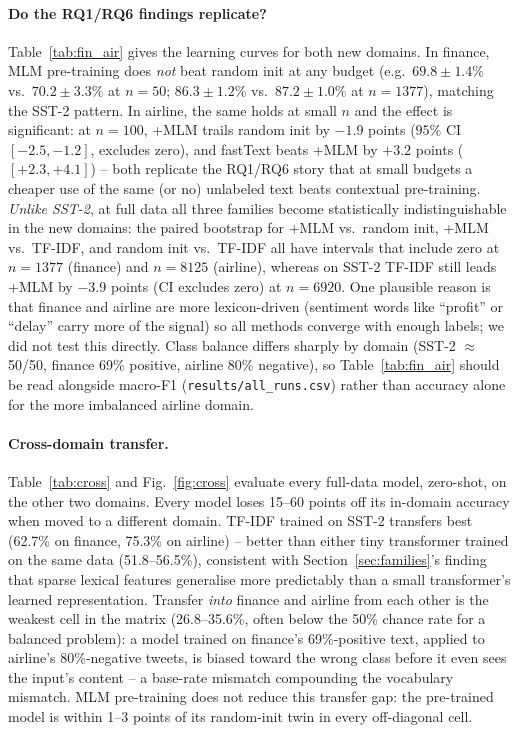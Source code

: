 \documentclass[11pt,a4paper]{article}
\begin{document}
\paragraph{Do the RQ1/RQ6 findings replicate?} Table~\ref{tab:fin_air} gives the learning curves for both new domains. In finance, MLM pre-training does \emph{not} beat random init at any budget (e.g.\ $69.8\pm1.4\%$ vs.\ $70.2\pm3.3\%$ at $n{=}50$; $86.3\pm1.2\%$ vs.\ $87.2\pm1.0\%$ at $n{=}1377$), matching the SST-2 pattern. In airline, the same holds at small $n$ and the effect is significant: at $n{=}100$, +MLM trails random init by $-1.9$ points ($95\%$ CI $[-2.5,-1.2]$, excludes zero), and fastText beats +MLM by $+3.2$ points ($[+2.3,+4.1]$) -- both replicate the RQ1/RQ6 story that at small budgets a cheaper use of the same (or no) unlabeled text beats contextual pre-training.
\emph{Unlike SST-2}, at full data all three families become statistically indistinguishable in the new domains: the paired bootstrap for +MLM vs.\ random init, +MLM vs.\ TF-IDF, and random init vs.\ TF-IDF all have intervals that include zero at $n{=}1377$ (finance) and $n{=}8125$ (airline), whereas on SST-2 TF-IDF still leads +MLM by $-3.9$ points (CI excludes zero) at $n{=}6920$. One plausible reason is that finance and airline are more lexicon-driven (sentiment words like ``profit'' or ``delay'' carry more of the signal) so all methods converge with enough labels; we did not test this directly.
Class balance differs sharply by domain (SST-2 $\approx$50/50, finance 69\% positive, airline 80\% negative), so Table~\ref{tab:fin_air} should be read alongside macro-F1 (\texttt{results/all\_runs.csv}) rather than accuracy alone for the more imbalanced airline domain.





\paragraph{Cross-domain transfer.} Table~\ref{tab:cross} and Fig.~\ref{fig:cross} evaluate every full-data model, zero-shot, on the other two domains. Every model loses 15--60 points off its in-domain accuracy when moved to a different domain. TF-IDF trained on SST-2 transfers best (62.7\% on finance, 75.3\% on airline) -- better than either tiny transformer trained on the same data (51.8--56.5\%), consistent with Section~\ref{sec:families}'s finding that sparse lexical features generalise more predictably than a small transformer's learned representation.
Transfer \emph{into} finance and airline from each other is the weakest cell in the matrix (26.8--35.6\%, often below the 50\% chance rate for a balanced problem): a model trained on finance's 69\%-positive text, applied to airline's 80\%-negative tweets, is biased toward the wrong class before it even sees the input's content -- a base-rate mismatch compounding the vocabulary mismatch. MLM pre-training does not reduce this transfer gap: the pre-trained model is within 1--3 points of its random-init twin in every off-diagonal cell.
\end{document}
